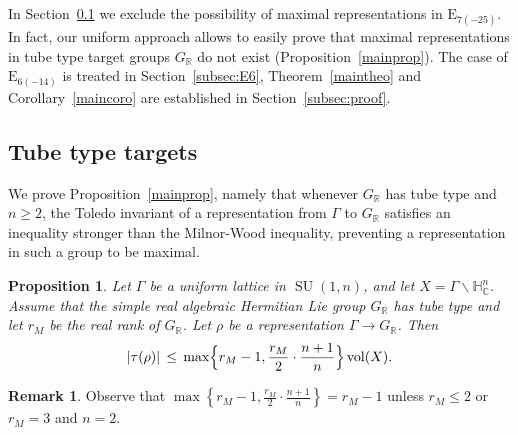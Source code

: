 \documentclass[JEP,XML,SOM,Unicode,NoFloatCountersInSection]{cedram}
\theoremstyle{plain}
\newtheorem{prop}[theo]{Proposition}
\theoremstyle{definition}
\newtheorem{rema}[theo]{Remark}
\DeclareMathOperator{\SU}{SU}
\DeclareMathOperator{\vol}{vol}
\newcommand{\bR}{\mathbb{R}}
\newcommand{\HC}{{\mathbb{H}^n_\mathbb{C}}}
\newcommand{\rkm}{{r_M}}
\begin{document}
In Section~\ref{subsec:tube} we exclude the possibility of maximal representations in $\mathrm{E}_{7(-25)}$.
In fact, our uniform approach allows to easily prove that maximal
representations in tube type target groups $G_\bR$ do not exist (Proposition~\ref{mainprop}). The
case of $\mathrm{E}_{6(-14)}$ is
treated in Section~\ref{subsec:E6}, Theorem~\ref{maintheo} and Corollary~\ref{maincoro} are
established in Section~\ref{subsec:proof}.

\subsection{Tube type targets}\label{subsec:tube}

We prove Proposition~\ref{mainprop}, namely that whenever $G_\bR$ has tube type and $n\geq 2$,
the Toledo invariant of a representation
from $\Gamma$ to
$G_\bR$ satisfies an inequality stronger than the Milnor-Wood inequality, preventing a
representation in such a group to be maximal.

\begin{prop}
\label{prop:tube}
Let $\Gamma$ be a uniform lattice in $\SU(1,n)$, and let $X=\Gamma\backslash\HC$.
Assume that the simple real algebraic Hermitian Lie group $G_\bR$ has tube type and let $\rkm$ be the real rank of $G_\bR$. Let $\rho$ be a
representation $\Gamma\to G_\bR$. Then
$$
|\tau(\rho)|\,\leq\, \max\Bigl\{\rkm-1,\frac \rkm{2}\cdot \frac{n+1}{n}\Bigr\}\vol(X). $$
\end{prop}

\begin{rema}
Observe that $\max\left\{{\rkm-1,\frac \rkm{2}\cdot \frac{n+1}{n}}\right\}=\rkm-1$ unless
$\rkm\leq 2$ or $\rkm=3$ and $n=2$.
\end{rema}
\end{document}
